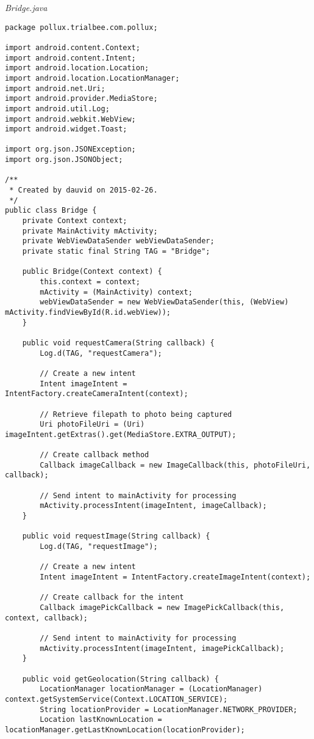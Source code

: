 \emph{Bridge.java}
\begin{lstlisting}
package pollux.trialbee.com.pollux;

import android.content.Context;
import android.content.Intent;
import android.location.Location;
import android.location.LocationManager;
import android.net.Uri;
import android.provider.MediaStore;
import android.util.Log;
import android.webkit.WebView;
import android.widget.Toast;

import org.json.JSONException;
import org.json.JSONObject;

/**
 * Created by dauvid on 2015-02-26.
 */
public class Bridge {
    private Context context;
    private MainActivity mActivity;
    private WebViewDataSender webViewDataSender;
    private static final String TAG = "Bridge";

    public Bridge(Context context) {
        this.context = context;
        mActivity = (MainActivity) context;
        webViewDataSender = new WebViewDataSender(this, (WebView) mActivity.findViewById(R.id.webView));
    }

    public void requestCamera(String callback) {
        Log.d(TAG, "requestCamera");

        // Create a new intent
        Intent imageIntent = IntentFactory.createCameraIntent(context);

        // Retrieve filepath to photo being captured
        Uri photoFileUri = (Uri) imageIntent.getExtras().get(MediaStore.EXTRA_OUTPUT);

        // Create callback method
        Callback imageCallback = new ImageCallback(this, photoFileUri, callback);

        // Send intent to mainActivity for processing
        mActivity.processIntent(imageIntent, imageCallback);
    }

    public void requestImage(String callback) {
        Log.d(TAG, "requestImage");

        // Create a new intent
        Intent imageIntent = IntentFactory.createImageIntent(context);

        // Create callback for the intent
        Callback imagePickCallback = new ImagePickCallback(this, context, callback);

        // Send intent to mainActivity for processing
        mActivity.processIntent(imageIntent, imagePickCallback);
    }

    public void getGeolocation(String callback) {
        LocationManager locationManager = (LocationManager) context.getSystemService(Context.LOCATION_SERVICE);
        String locationProvider = LocationManager.NETWORK_PROVIDER;
        Location lastKnownLocation = locationManager.getLastKnownLocation(locationProvider);


\end{lstlisting}

